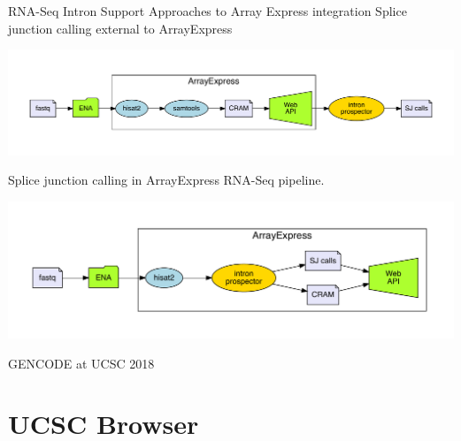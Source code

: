 \documentclass[10pt,
               hyperref={bookmarks=false,
                         bookmarksopen=false,
                         colorlinks=true,
                         linkcolor=blue,
                         urlcolor=blue},
               xcolor={svgnames,table}]{beamer}
\newcommand{\sectionframe}[1]{
  \begin{frame}{GENCODE at UCSC 2018}
    \section{#1}
  \end{frame}
}
\begin{document}
\begin{frame}{RNA-Seq Intron Support}
  Approaches to Array Express integration
  Splice junction calling external to ArrayExpress

  \begin{center}
    \includegraphics[scale=0.42]{images/calling_external.pdf}
  \end{center}

  Splice junction calling in ArrayExpress RNA-Seq pipeline.
  \begin{center}
    \includegraphics[scale=0.42]{images/calling_at_array_express.pdf}
  \end{center}
\end{frame}

\sectionframe{UCSC Browser}

\end{document}
